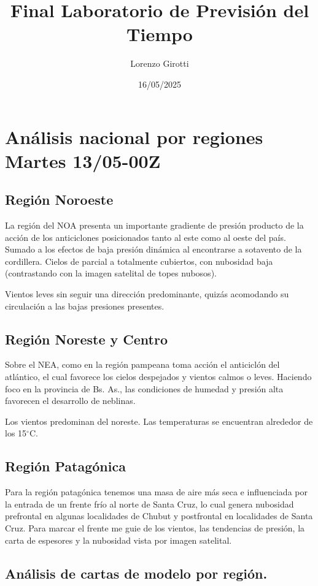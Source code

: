 \documentclass{article}
\title{Final Laboratorio de Previsión del Tiempo}
\author{Lorenzo Girotti}
\date{16/05/2025}
\begin{document}
\maketitle
\section{Análisis nacional por regiones Martes 13/05-00Z}
\subsection{Región Noroeste}
La región del NOA presenta un importante gradiente de presión producto de la acción de los anticiclones 
posicionados tanto al este como al oeste del país. Sumado a los efectos de baja presión dinámica al encontrarse a sotavento 
de la cordillera. Cielos de parcial a totalmente cubiertos, con nubosidad baja 
(contrastando con la imagen satelital de topes nubosos).

Vientos leves sin seguir una dirección predominante, quizás acomodando su circulación a las bajas presiones presentes.

\subsection{Región Noreste y Centro}
Sobre el NEA, como en la región pampeana toma acción el anticiclón del atlántico, el cual favorece los cielos despejados y 
vientos calmos o leves. Haciendo foco en la provincia de Bs. As., las condiciones de humedad y presión alta favorecen el 
desarrollo de neblinas.

Los vientos predominan del noreste. Las temperaturas se encuentran alrededor de los 15$^\circ$C.

\subsection{Región Patagónica}
Para la región patagónica tenemos una masa de aire más seca e influenciada por la entrada de un frente frío al norte de Santa Cruz,
lo cual genera nubosidad prefrontal en algunas localidades de Chubut y postfrontal en localidades de Santa Cruz. Para marcar el 
frente me guie de los vientos, las tendencias de presión,  la carta de espesores y la nubosidad vista por imagen satelital.

\subsection{Análisis de cartas de modelo por región.}
\end{document}
